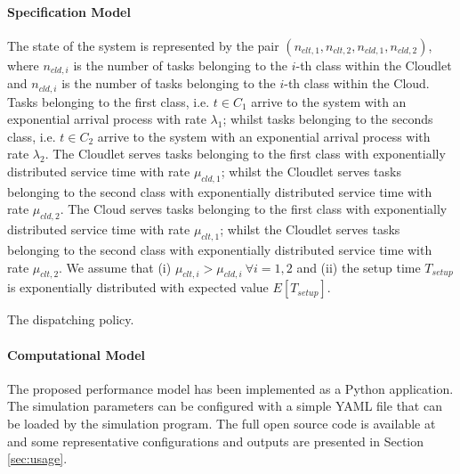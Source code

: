 \paragraph{Specification Model}
The state of the system is represented by the pair $(n_{clt,1},n_{clt,2},n_{cld,1},n_{cld,2})$, where $n_{cld,i}$ is the number of tasks belonging to the $i$-th class within the Cloudlet and $n_{cld,i}$ is the number of tasks belonging to the $i$-th class within the Cloud.
Tasks belonging to the first class, i.e. $t\in C_{1}$ arrive to the system with an exponential arrival process with rate $ \lambda_{1}$; whilst tasks belonging to the seconds class, i.e. $t\in C_{2}$ arrive to the system with an exponential arrival process with rate $ \lambda_{2}$.
The Cloudlet serves tasks belonging to the first class with exponentially distributed service time with rate $\mu_{cld,1}$; whilst the Cloudlet serves tasks belonging to the second class with exponentially distributed service time with rate $\mu_{cld,2}$.
The Cloud serves tasks belonging to the first class with exponentially distributed service time with rate $\mu_{clt,1}$; whilst the Cloudlet serves tasks belonging to the second class with exponentially distributed service time with rate $\mu_{clt,2}$.
We assume that 
(i) $\mu_{clt,i}>\mu_{cld,i}\ \forall i=1,2$ and
(ii) the setup time $T_{setup}$ is exponentially distributed with expected value $E[T_{setup}]$.

\begin{algorithm}
	\SetAlgoLined
	\caption{The dispatching policy.}
	\label{alg:modeling-dispatching-policy}
\end{algorithm}

\paragraph{Computational Model}
The proposed performance model has been implemented as a Python application. 
The simulation parameters can be configured with a simple YAML file that can be loaded by the simulation program.
The full open source code is available at \cite{gmarciani-demule} and some representative configurations and outputs are presented in Section \ref{sec:usage}.

